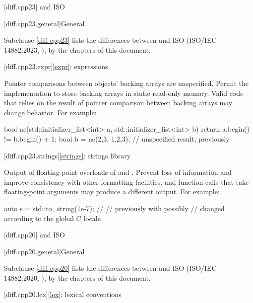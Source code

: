 
[diff.cpp23]{\Cpp{} and ISO \CppXXIII{}}

[diff.cpp23.general]{General}

\pnum
{}%
Subclause \ref{diff.cpp23} lists the differences between \Cpp{} and
ISO \CppXXIII{} (ISO/IEC 14882:2023, ),
by the chapters of this document.

[diff.cpp23.expr]{\ref{expr}: expressions}

\change
Pointer comparisons between  objects' backing arrays
are unspecified.
\rationale
Permit the implementation to store backing arrays in static read-only memory.
\effect
Valid \CppXXIII{} code
that relies on the result of pointer comparison between backing arrays
may change behavior.
For example:
\begin{example}
bool ne(std::initializer_list<int> a, std::initializer_list<int> b) {
  return a.begin() != b.begin() + 1;
}
bool b = ne({2,3}, {1,2,3}); // unspecified result; previously 
\end{example}

[diff.cpp23.strings]{\ref{strings}: strings library}

\change
Output of floating-point overloads of  and .
\rationale
Prevent loss of information and improve consistency with other formatting
facilities.
\effect
{} and  function calls that take
floating-point arguments may produce a different output.
For example:
\begin{codeblock}
auto s = std::to_string(1e-7);  // 
                                // previously  with  possibly
                                // changed according to the global C locale
\end{codeblock}

[diff.cpp20]{\Cpp{} and ISO \CppXX{}}

[diff.cpp20.general]{General}

\pnum
{}%
Subclause \ref{diff.cpp20} lists the differences between \Cpp{} and
ISO \CppXX{} (ISO/IEC 14882:2020, ),
by the chapters of this document.

[diff.cpp20.lex]{\ref{lex}: lexical conventions}


